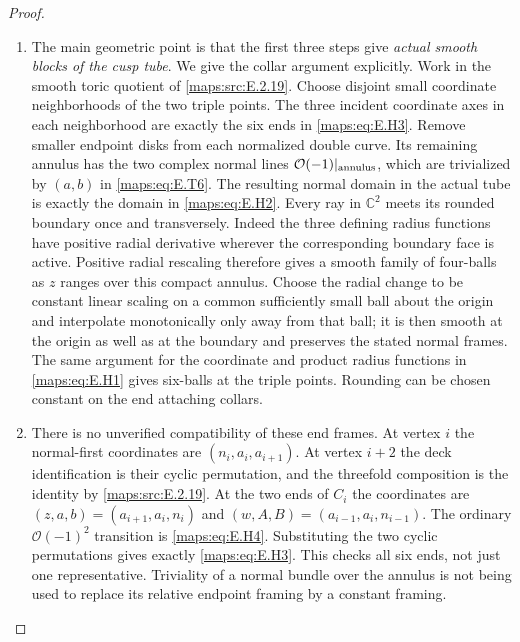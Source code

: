 \begin{proof}
\begin{enumerate}[label=\arabic*.,leftmargin=*]
\item The main geometric point is that the first three steps give
\emph{actual smooth blocks of the cusp tube}.  We give the collar
argument explicitly.  Work in the smooth toric quotient of \ref{maps:src:E.2.19}.
Choose disjoint small coordinate neighborhoods of the two triple
points.  The three incident coordinate axes in each neighborhood
are exactly the six ends in \eqref{maps:eq:E.H3}.  Remove smaller endpoint disks
from each normalized double curve.  Its remaining annulus has
the two complex normal lines $\mathcal O(-1)|_{\rm annulus}$,
which are trivialized by $(a,b)$ in \eqref{maps:eq:E.T6}.  The resulting normal
domain in the actual tube is exactly the domain in \eqref{maps:eq:E.H2}.
Every ray in $\mathbb C^2$ meets its rounded boundary once and
transversely.  Indeed the three defining radius functions have
positive radial derivative wherever the corresponding boundary
face is active.  Positive radial rescaling therefore gives a
smooth family of four-balls as $z$ ranges over this compact
annulus.  Choose the radial change to be constant linear scaling
on a common sufficiently small ball about the origin and interpolate
monotonically only away from that ball; it is then smooth at the
origin as well as at the boundary and preserves the stated normal
frames.  The same argument for the coordinate and product
radius functions in \eqref{maps:eq:E.H1} gives six-balls at the triple points.
Rounding can be chosen constant on the end attaching collars.

\item There is no unverified compatibility of these end frames.  At
vertex $i$ the normal-first coordinates are $(n_i,a_i,a_{i+1})$.
At vertex $i+2$ the deck identification is their cyclic
permutation, and the threefold composition is the identity by
\ref{maps:src:E.2.19}.  At the two ends of $C_i$ the coordinates are
$(z,a,b)=(a_{i+1},a_i,n_i)$ and
$(w,A,B)=(a_{i-1},a_i,n_{i-1})$.  The ordinary
$\mathcal O(-1)^2$ transition is \eqref{maps:eq:E.H4}.  Substituting the two
cyclic permutations gives exactly \eqref{maps:eq:E.H3}.  This checks all six
ends, not just one representative.  Triviality of a normal bundle
over the annulus is not being used to replace its relative
endpoint framing by a constant framing.


\end{enumerate}
\end{proof}

